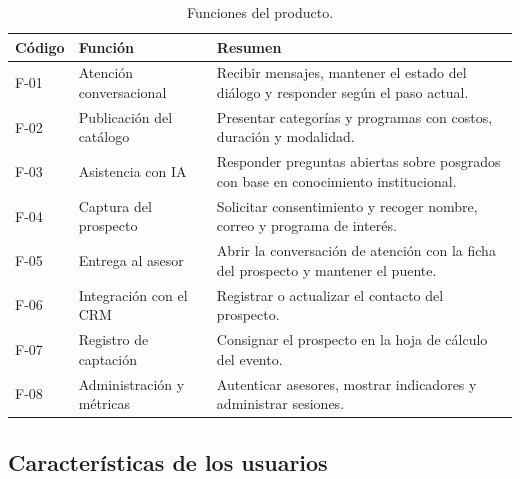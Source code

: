 \documentclass[12pt,a4paper]{report}
\newcommand{\tablacompacta}{\setstretch{1.1}\small}
\newcommand{\cabecera}[1]{\rowcolor{filacabecera}#1}
\begin{document}
\begin{table}[H]
    \centering
    \tablacompacta
    \begin{tabularx}{\textwidth}{p{1.4cm}p{4.0cm}X}
        \toprule
        \cabecera{\textbf{Código}} & \textbf{Función} & \textbf{Resumen} \\
        \midrule
        F-01 & Atención conversacional & Recibir mensajes, mantener el estado del diálogo y responder según el paso actual. \\
        F-02 & Publicación del catálogo & Presentar categorías y programas con costos, duración y modalidad. \\
        F-03 & Asistencia con IA & Responder preguntas abiertas sobre posgrados con base en conocimiento institucional. \\
        F-04 & Captura del prospecto & Solicitar consentimiento y recoger nombre, correo y programa de interés. \\
        F-05 & Entrega al asesor & Abrir la conversación de atención con la ficha del prospecto y mantener el puente. \\
        F-06 & Integración con el CRM & Registrar o actualizar el contacto del prospecto. \\
        F-07 & Registro de captación & Consignar el prospecto en la hoja de cálculo del evento. \\
        F-08 & Administración y métricas & Autenticar asesores, mostrar indicadores y administrar sesiones. \\
        \bottomrule
    \end{tabularx}
    \caption{Funciones del producto.}
\end{table}

\subsection{Características de los usuarios}
\end{document}
